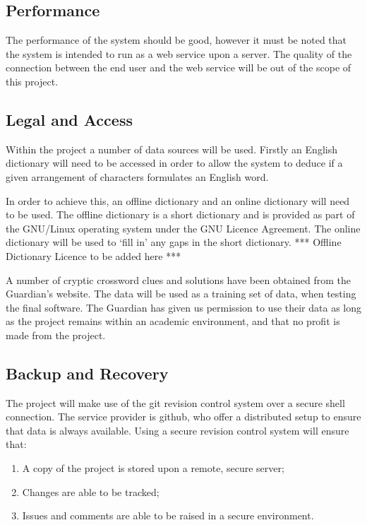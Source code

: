 \subsection{Performance}

The performance of the system should be good, however it must be noted that the
system is intended to run as a web service upon a server. The quality of the 
connection between the end user and the web service will be out of the scope of
this project.


\subsection{Legal and Access}

Within the project a number of data sources will be used. Firstly an English
dictionary will need to be accessed in order to allow the system to deduce if a 
given arrangement of characters formulates an English word.

In order to achieve this, an offline dictionary and an online dictionary will
need to be used. The offline dictionary is a short dictionary and is provided as
part of the GNU/Linux operating system under the GNU Licence Agreement. The 
online dictionary will be used to `fill in' any gaps in the short dictionary.
*** Offline Dictionary Licence to be added here ***

A number of cryptic crossword clues and solutions have been obtained from the
Guardian's website. The data will be used as a training set of data, when
testing the final software. The Guardian has given us permission to use their
data as long as the project remains within an academic environment, and that no
profit is made from the project.


\subsection{Backup and Recovery}

The project will make use of the git revision control system over a secure shell 
connection. The service provider is github, who offer a distributed setup to 
ensure that data is always available. Using a secure revision control system 
will ensure that:

\begin{enumerate}
  \item A copy of the project is stored upon a remote, secure server;
  \item Changes are able to be tracked;
  \item Issues and comments are able to be raised in a secure environment.
\end{enumerate}

